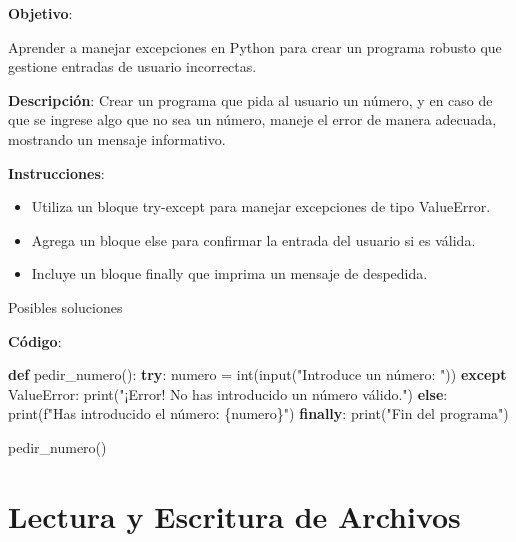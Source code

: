 \documentclass[
  a4paper,
  DIV=11,
  numbers=noendperiod,
  onepage,
  openany]{scrreprt}
\newenvironment{Shaded}{\begin{snugshade}}{\end{snugshade}}
\newcommand{\BuiltInTok}[1]{\textcolor[rgb]{0.00,0.23,0.31}{#1}}
\newcommand{\ControlFlowTok}[1]{\textcolor[rgb]{0.00,0.23,0.31}{\textbf{#1}}}
\newcommand{\KeywordTok}[1]{\textcolor[rgb]{0.00,0.23,0.31}{\textbf{#1}}}
\newcommand{\NormalTok}[1]{\textcolor[rgb]{0.00,0.23,0.31}{#1}}
\newcommand{\OperatorTok}[1]{\textcolor[rgb]{0.37,0.37,0.37}{#1}}
\newcommand{\PreprocessorTok}[1]{\textcolor[rgb]{0.68,0.00,0.00}{#1}}
\newcommand{\SpecialCharTok}[1]{\textcolor[rgb]{0.37,0.37,0.37}{#1}}
\newcommand{\SpecialStringTok}[1]{\textcolor[rgb]{0.13,0.47,0.30}{#1}}
\newcommand{\StringTok}[1]{\textcolor[rgb]{0.13,0.47,0.30}{#1}}
\begin{document}
\textbf{Objetivo}:

Aprender a manejar excepciones en Python para crear un programa robusto
que gestione entradas de usuario incorrectas.

\textbf{Descripción}: Crear un programa que pida al usuario un número, y
en caso de que se ingrese algo que no sea un número, maneje el error de
manera adecuada, mostrando un mensaje informativo.

\textbf{Instrucciones}:

\begin{itemize}
\item
  Utiliza un bloque try-except para manejar excepciones de tipo
  ValueError.
\item
  Agrega un bloque else para confirmar la entrada del usuario si es
  válida.
\item
  Incluye un bloque finally que imprima un mensaje de despedida.
\end{itemize}

Posibles soluciones

\textbf{Código}:

\begin{Shaded}
\begin{Highlighting}[]
\KeywordTok{def}\NormalTok{ pedir\_numero():}
    \ControlFlowTok{try}\NormalTok{:}
\NormalTok{        numero }\OperatorTok{=} \BuiltInTok{int}\NormalTok{(}\BuiltInTok{input}\NormalTok{(}\StringTok{"Introduce un número: "}\NormalTok{))}
    \ControlFlowTok{except} \PreprocessorTok{ValueError}\NormalTok{:}
        \BuiltInTok{print}\NormalTok{(}\StringTok{"¡Error! No has introducido un número válido."}\NormalTok{)}
    \ControlFlowTok{else}\NormalTok{:}
        \BuiltInTok{print}\NormalTok{(}\SpecialStringTok{f"Has introducido el número: }\SpecialCharTok{\{}\NormalTok{numero}\SpecialCharTok{\}}\SpecialStringTok{"}\NormalTok{)}
    \ControlFlowTok{finally}\NormalTok{:}
        \BuiltInTok{print}\NormalTok{(}\StringTok{"Fin del programa"}\NormalTok{)}

\NormalTok{pedir\_numero()}
\end{Highlighting}
\end{Shaded}

\chapter{Lectura y Escritura de
Archivos}\label{lectura-y-escritura-de-archivos}
\end{document}
